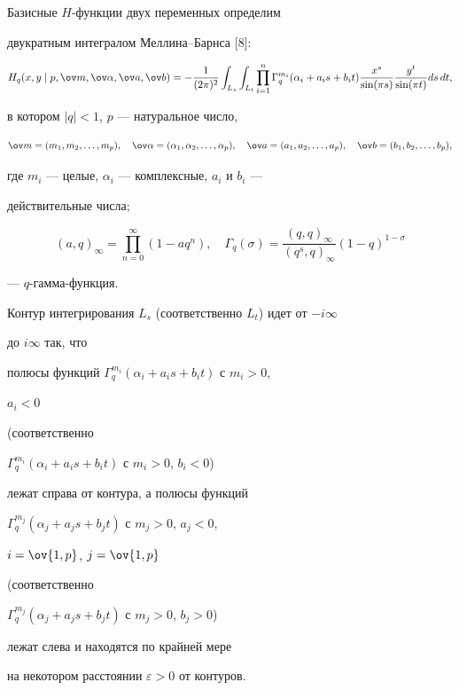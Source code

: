 \begin{defn} 


Базисные $H$-функции двух переменных определим 


двукратным интегралом Меллина--Барнса [8]: 


\begin{equation} 


H_q(x,y\mid p,\ov m,\ov\alpha,\ov a,\ov b)= 


-\frac{1}{(2\pi)^2}\int_{L_s}\int_{L_t}\prod^n_{i=1} 


\Gamma^{m_i}_q(\alpha_i+a_i s+b_i t) 


\frac{x^s}{\sin(\pi s)}\frac{y^t}{\sin(\pi t)}ds\,dt, 


\end{equation} 


в котором $|q|<1$, $p$ --- натуральное число, 


$$ 


\ov m=(m_1,m_2,\dotsc,m_p),\quad 


\ov\alpha=(\alpha_1,\alpha_2,\dotsc,\alpha_p),\quad 


\ov a=(a_1,a_2,\dotsc,a_p),\quad 


\ov b=(b_1,b_2,\dotsc,b_p), 


$$ 


где $m_i$ --- целые, $\alpha_i$ --- комплексные, $a_i$ и $b_i$ --- 


действительные числа; 


$$ 


(a,q)_\infty=\prod^\infty_{n=0}(1-a q^n),\quad 


\Gamma_q(\sigma)=\frac{(q,q)_\infty}{(q^s,q)_\infty} 


(1-q)^{1-\sigma} 


$$ 


--- $q$-гамма-функция. 


 


Контур интегрирования $L_s$ (соответственно $L_t$) идет от $-i\infty$ 


до $i\infty$ так, что 


полюсы функций $\Gamma^{m_i}_q(\alpha_i+a_i s+b_i t)$ с $m_i>0$, 


$a_i<0$ 


(соответственно 


$\Gamma^{m_i}_q(\alpha_i+a_i s+b_i t)$ с $m_i>0$, $b_i<0$) 


лежат справа от контура, а полюсы функций 


$\Gamma^{m_j}_q(\alpha_j+a_j s+b_j t)$ с $m_j>0$, $a_j<0$, 


$i=\ov{1,p}$, $j=\ov{1,p}$ 


(соответственно 


$\Gamma^{m_j}_q(\alpha_j+a_j s+b_j t)$ с $m_j>0$, $b_j>0$) 


лежат слева и находятся по крайней мере 


на некотором расстоянии $\varepsilon>0$ от контуров. 


\end{defn} 


